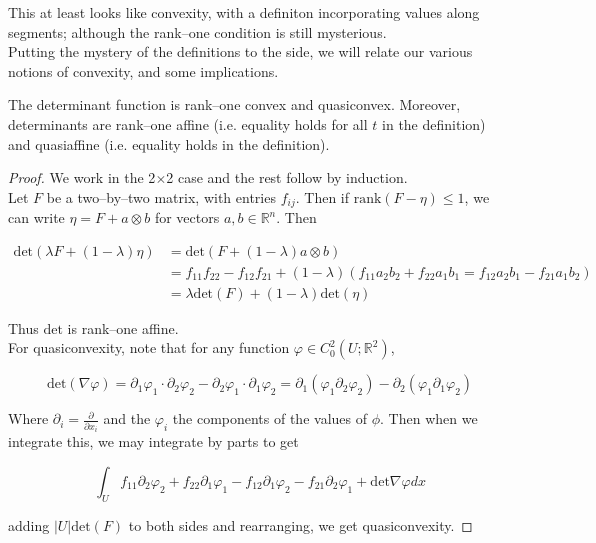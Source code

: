 \documentclass[../main.tex]{subfiles}
\begin{document}
This at least looks like convexity, with a definiton incorporating values along segments; although the rank--one condition is still mysterious. \\

Putting the mystery of the definitions to the side, we will relate our various notions of convexity, and some implications.

\begin{lem}
  The determinant function is rank--one convex and quasiconvex.
  Moreover, determinants are rank--one affine (i.e. equality holds for all $t$ in the definition) and quasiaffine (i.e. equality holds in the definition).
\end{lem}

\begin{proof}
  We work in the 2$\times$2 case and the rest follow by induction. \\

  Let $F$ be a two--by--two matrix, with entries $f_{ij}$.
  Then if $\mathrm{rank}(F - \eta) \leq 1$, we can write $\eta = F + a \otimes b$ for vectors $a,b \in \mathbb{R}^n$.
  Then
  
\begin{align*}
  \mathrm{det} ( \lambda F + (1- \lambda) \eta) &= \mathrm{det} ( F + (1-\lambda) a \otimes b) \\
                                 &= f_{11} f_{22} - f_{12}f_{21} + (1-\lambda) (f_{11} a_2b_2 + f_{22} a_1b_1 = f_{12} a_2b_1 - f_{21} a_1b_2) \\
  &= \lambda \mathrm{det}(F) + (1-\lambda) \mathrm{det} (\eta)
\end{align*}

Thus $\mathrm{det}$ is rank--one affine. \\

For quasiconvexity, note that for any function $\varphi \in C_0^2( U; \mathbb{R}^2)$,

\begin{equation*}
  \mathrm{det} ( \nabla \varphi) = \partial_1\varphi_1 \cdot \partial_2\varphi_2 - \partial_2\varphi_1 \cdot \partial_1 \varphi_2 = \partial_1 ( \varphi_1 \partial_2 \varphi_2) - \partial_2 ( \varphi_1 \partial_1 \varphi_2)
\end{equation*}

Where $\partial_i = \frac{\partial}{\partial x_i}$ and the $\varphi_i$ the components of the values of $\phi$.
Then when we integrate this, we may integrate by parts to get

\begin{equation*}
  \int_U f_{11} \partial_2 \varphi_2 + f_{22} \partial_1 \varphi_1 - f_{12} \partial_1 \varphi_2 - f_{21} \partial_2 \varphi_1 + \mathrm{det} \nabla \varphi dx
\end{equation*}

adding $\left| U \right| \mathrm{det} (F)$ to both sides and rearranging, we get quasiconvexity.

\end{proof}
\end{document}
